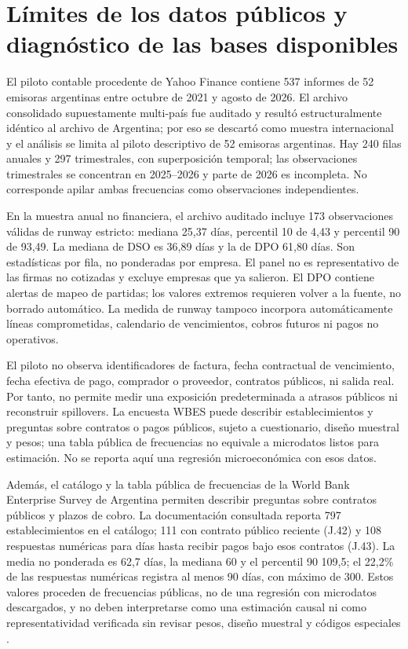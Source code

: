 \documentclass[11pt,a4paper]{article}
\begin{document}
\section{Límites de los datos públicos y diagnóstico de las bases disponibles}
El piloto contable procedente de Yahoo Finance contiene 537 informes de 52 emisoras argentinas entre octubre de 2021 y agosto de 2026. El archivo consolidado supuestamente multi-país fue auditado y resultó estructuralmente idéntico al archivo de Argentina; por eso se descartó como muestra internacional y el análisis se limita al piloto descriptivo de 52 emisoras argentinas. Hay 240 filas anuales y 297 trimestrales, con superposición temporal; las observaciones trimestrales se concentran en 2025--2026 y parte de 2026 es incompleta. No corresponde apilar ambas frecuencias como observaciones independientes.

En la muestra anual no financiera, el archivo auditado incluye 173 observaciones válidas de runway estricto: mediana 25,37 días, percentil 10 de 4,43 y percentil 90 de 93,49. La mediana de DSO es 36,89 días y la de DPO 61,80 días. Son estadísticas por fila, no ponderadas por empresa. El panel no es representativo de las firmas no cotizadas y excluye empresas que ya salieron. El DPO contiene alertas de mapeo de partidas; los valores extremos requieren volver a la fuente, no borrado automático. La medida de runway tampoco incorpora automáticamente líneas comprometidas, calendario de vencimientos, cobros futuros ni pagos no operativos.

El piloto no observa identificadores de factura, fecha contractual de vencimiento, fecha efectiva de pago, comprador o proveedor, contratos públicos, ni salida real. Por tanto, no permite medir una exposición predeterminada a atrasos públicos ni reconstruir spillovers. La encuesta WBES puede describir establecimientos y preguntas sobre contratos o pagos públicos, sujeto a cuestionario, diseño muestral y pesos; una tabla pública de frecuencias no equivale a microdatos listos para estimación. No se reporta aquí una regresión microeconómica con esos datos.

Además, el catálogo y la tabla pública de frecuencias de la World Bank Enterprise Survey de Argentina permiten describir preguntas sobre contratos públicos y plazos de cobro. La documentación consultada reporta 797 establecimientos en el catálogo; 111 con contrato público reciente (J.42) y 108 respuestas numéricas para días hasta recibir pagos bajo esos contratos (J.43). La media no ponderada es 62,7 días, la mediana 60 y el percentil 90 109,5; el 22,2\% de las respuestas numéricas registra al menos 90 días, con máximo de 300. Estos valores proceden de frecuencias públicas, no de una regresión con microdatos descargados, y no deben interpretarse como una estimación causal ni como representatividad verificada sin revisar pesos, diseño muestral y códigos especiales \citep{wbes2026}.
\end{document}
